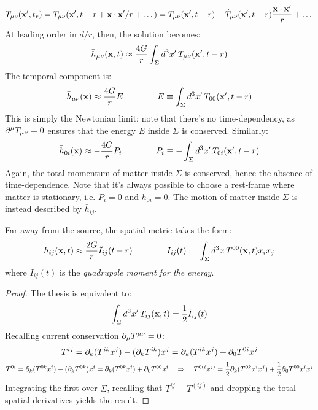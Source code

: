 \begin{equation*}
  T_{\mu \nu}(\mathbf{x}',t_r) = T_{\mu \nu} (\mathbf{x}', t - r + \mathbf{x} \cdot \mathbf{x}' / r + \dots) = T_{\mu \nu}(\mathbf{x}', t - r) + \dot{T}_{\mu \nu} (\mathbf{x}', t - r) \frac{\mathbf{x} \cdot \mathbf{x}'}{r} + \dots
\end{equation*}
At leading order in $ d/r $, then, the solution becomes:
\begin{equation*}
  \bar{h}_{\mu \nu} (\mathbf{x},t) \approx \frac{4G}{r} \int_\Sigma d^3 x'\, T_{\mu \nu}(\mathbf{x}', t - r)
\end{equation*}
The temporal component is:
\begin{equation*}
  \bar{h}_{\mu \nu}(\mathbf{x}) \approx \frac{4G}{r} E
  \qquad \qquad
  E \equiv \int_\Sigma d^3 x'\, T_{00}(\mathbf{x}', t - r)
\end{equation*}
This is simply the Newtonian limit; note that there's no time-dependency, as $ \partial^\mu T_{\mu \nu} = 0 $ ensures that the energy $ E $ inside $ \Sigma $ is conserved. Similarly:
\begin{equation*}
  \bar{h}_{0 i}(\mathbf{x}) \approx - \frac{4G}{r} P_i
  \qquad \qquad
  P_i \equiv - \int_\Sigma d^3 x'\, T_{0 i}(\mathbf{x}', t - r)
\end{equation*}
Again, the total momentum of matter inside $ \Sigma $ is conserved, hence the absence of time-dependence. Note that it's always possible to choose a rest-frame where matter is stationary, i.e. $ P_i = 0 $ and $ h_{0 i} = 0 $. The motion of matter inside $ \Sigma $ is instead described by $ \bar{h}_{ij} $.

\begin{proposition}
  Far away from the source, the spatial metric takes the form:
  \begin{equation}
    \bar{h}_{ij}(\ve{x},t) \approx \frac{2G}{r} \ddot{I}_{ij}(t - r)
    \qquad \qquad
    I_{ij}(t) \defeq \int_\Sigma d^3 x\, T^{00}(\ve{x},t) x_i x_j
    \label{eq:5.26}
  \end{equation}
  where $ I_{ij}(t) $ is the \textit{quadrupole moment for the energy}.
\end{proposition}
\begin{proof}
  The thesis is equivalent to:
  \begin{equation*}
    \int_\Sigma d^3 x'\, T_{ij}(\mathbf{x},t) = \frac{1}{2} \ddot{I}_{ij}(t)
  \end{equation*}
  Recalling current conservation $ \partial_\mu T^{\mu \nu} = 0 $:
  \begin{equation*}
    T^{ij} = \partial_k (T^{ik} x^j) - (\partial_k T^{ik}) x^j = \partial_k (T^{ik} x^j) + \partial_0 T^{0i} x^j
  \end{equation*}
  \begin{equation*}
    T^{0i} = \partial_k (T^{0k} x^i) - (\partial_k T^{0k}) x^i = \partial_k (T^{0k} x^i) + \partial_0 T^{00} x^i
    \quad \Rightarrow \quad
    T^{0(i} x^{j)} = \frac{1}{2} \partial_k (T^{0k} x^i x^j) + \frac{1}{2} \partial_0 T^{00} x^i x^j
  \end{equation*}
  Integrating the first over $ \Sigma $, recalling that $ T^{ij} = T^{(ij)} $ and dropping the total spatial derivatives yields the result.
\end{proof}

